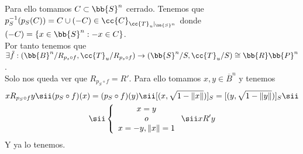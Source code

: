 \begin{ejemplo}
\begin{itemize}
        Para ello tomamos $C\subset \bb{S}^n$ cerrado. Tenemos que $p_S^{-1}(p_S(C)) = C \cup (-C) \in \cc{C}_{\cc{T}_u|_{\bb{S}^n}}$ donde $(-C)=\{x\in \bb{S}^n : -x \in C\}$.\\

        Por tanto tenemos que $\exists \tilde{f}:(\bb{B}^n/R_{p_s\circ f}, \cc{T}_u/R_{p_s \circ f}) \to (\bb{S}^n/S, \cc{T}_u/S)\cong \bb{R}\bb{P}^n$.\\

        Solo nos queda ver que $R_{p_S \circ f}=R'$. Para ello tomamos $x,y\in \overline{B}^n$ y tenemos 
        \begin{gather*}
            xR_{p_S\circ f}y \sii (p_S \circ f)(x) = (p_S \circ f)(y) \sii [(x, \sqrt{1-\|x\|})]_S =  [(y, \sqrt{1-\|y\|})]_S \sii\\
            \sii \left\{
            \begin{array}{c}
                x=y\\
                o\\
                x=-y, \|x\|=1
            \end{array}
            \right. \sii xR'y
        \end{gather*}
        Y ya lo tenemos.
    \end{itemize}
    \endsquare
 \end{ejemplo}

